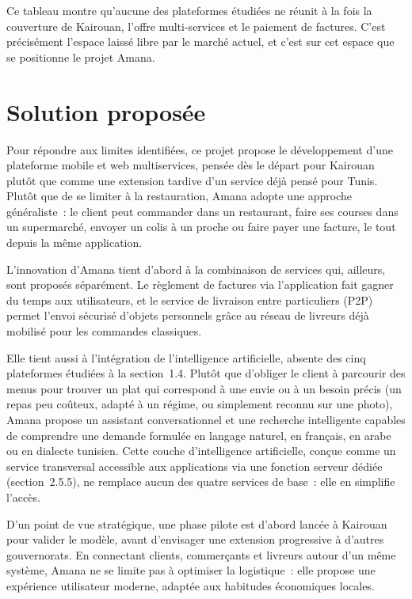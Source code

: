 \documentclass[12pt,fleqn,a4paper]{report}
\begin{document}
\begin{justify}
Ce tableau montre qu'aucune des plateformes étudiées ne réunit à la fois la couverture de Kairouan, l'offre multi-services et le paiement de factures. C'est précisément l'espace laissé libre par le marché actuel, et c'est sur cet espace que se positionne le projet Amana.

\section{Solution proposée}

Pour répondre aux limites identifiées, ce projet propose le développement d'une plateforme mobile et web multiservices, pensée dès le départ pour Kairouan plutôt que comme une extension tardive d'un service déjà pensé pour Tunis. Plutôt que de se limiter à la restauration, Amana adopte une approche généraliste~: le client peut commander dans un restaurant, faire ses courses dans un supermarché, envoyer un colis à un proche ou faire payer une facture, le tout depuis la même application.

L'innovation d'Amana tient d'abord à la combinaison de services qui, ailleurs, sont proposés séparément. Le règlement de factures via l'application fait gagner du temps aux utilisateurs, et le service de livraison entre particuliers (P2P) permet l'envoi sécurisé d'objets personnels grâce au réseau de livreurs déjà mobilisé pour les commandes classiques.

Elle tient aussi à l'intégration de l'intelligence artificielle, absente des cinq plateformes étudiées à la section~1.4. Plutôt que d'obliger le client à parcourir des menus pour trouver un plat qui correspond à une envie ou à un besoin précis (un repas peu coûteux, adapté à un régime, ou simplement reconnu sur une photo), Amana propose un assistant conversationnel et une recherche intelligente capables de comprendre une demande formulée en langage naturel, en français, en arabe ou en dialecte tunisien. Cette couche d'intelligence artificielle, conçue comme un service transversal accessible aux applications via une fonction serveur dédiée (section~2.5.5), ne remplace aucun des quatre services de base~: elle en simplifie l'accès.

D'un point de vue stratégique, une phase pilote est d'abord lancée à Kairouan pour valider le modèle, avant d'envisager une extension progressive à d'autres gouvernorats. En connectant clients, commerçants et livreurs autour d'un même système, Amana ne se limite pas à optimiser la logistique~: elle propose une expérience utilisateur moderne, adaptée aux habitudes économiques locales.


\end{justify}
\end{document}
